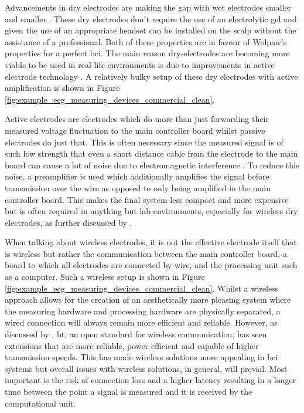 Advancements in dry electrodes are making the gap with wet electrodes smaller and smaller \citep{wet_vs_dry, dry_electrode_status, wet_dry_comparison_experiment}.
These dry electrodes don't require the use of an electrolytic gel and given the use of an appropriate headset can be installed on the scalp without the assistance of a professional. 
Both of these properties are in favour of Wolpaw's properties for a perfect \gls{bci}.
The main reason dry-electrodes are becoming more viable to be used in real-life environments is due to improvements in active electrode technology \citep{wet_vs_dry}.
A relatively bulky setup of these dry electrodes with active amplification is shown in Figure \ref{fig:example_eeg_measuring_devices_commercial_clean}.

Active electrodes are electrodes which do more than just forwarding their measured voltage fluctuation to the main controller board whilst passive electrodes do just that.
This is often necessary since the measured signal is of such low strength that even a short distance cable from the electrode to the main board can cause a lot of noise due to electromagnetic interference \citep{active_electrode_explained}.
To reduce this noise, a preamplifier is used which additionally amplifies the signal before transmission over the wire as opposed to only being amplified in the main controller board.
This makes the final system less compact and more expensive but is often required in anything but lab environments, especially for wireless dry electrodes, as further discussed by \citet{wet_vs_dry}.

When talking about wireless electrodes, it is not the effective electrode itself that is wireless but rather the communication between the main controller board, a board to which all electrodes are connected by wire, and the processing unit such as a computer.
Such a wireless setup is shown in Figure \ref{fig:example_eeg_measuring_devices_commercial_clean}.
Whilst a wireless approach allows for the creation of an aesthetically more pleasing system where the measuring hardware and processing hardware are physically separated, a wired connection will always remain more efficient and reliable. 
However, as discussed by \citet{bluetooth_evaluation}, \gls{bt}, an open standard for wireless communication, has seen extensions that are more reliable, power efficient and capable of higher transmission speeds.
This has made wireless solutions more appealing in \gls{bci} systems but overall issues with wireless solutions, in general, will prevail.
Most important is the risk of connection loss and a higher latency resulting in a longer time between the point a signal is measured and it is received by the computational unit.

